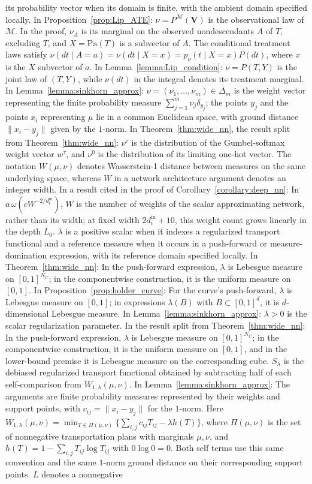 \documentclass[12pt]{article}
\theoremstyle{plain}
\theoremstyle{definition}
\theoremstyle{remark}
\begin{document}
its probability vector when its domain is finite, with the ambient domain specified locally. In Proposition~\ref{prop:Lip_ATE}: $\nu=P^{\mathcal M}(\boldsymbol V)$ is the observational law of $\mathcal M$. In the proof, $\nu_A$ is its marginal on the observed nondescendants $A$ of $T$, excluding $T$, and $X=\text{Pa}(T)$ is a subvector of $A$. The conditional treatment laws satisfy $\nu(dt\mid A=a)=\nu(dt\mid X=x)=p_\nu(t\mid X=x)P(dt)$, where $x$ is the $X$ subvector of $a$. In Lemma~\ref{lemma:Lip_condition}: $\nu=P(T,Y)$ is the joint law of $(T,Y)$, while $\nu(dt)$ in the integral denotes its treatment marginal. In Lemma~\ref{lemma:sinkhorn_approx}: $\nu=(\nu_1,\ldots,\nu_m)\in\Delta_m$ is the weight vector representing the finite probability measure $\sum_{j=1}^{m}\nu_j\delta_{y_j}$; the points $y_j$ and the points $x_i$ representing $\mu$ lie in a common Euclidean space, with ground distance $\|x_i-y_j\|$ given by the $1$-norm. In Theorem~\ref{thm:wide_nn}, the result split from Theorem~\ref{thm:wide_nn}: $\nu^\tau$ is the distribution of the Gumbel-softmax weight vector $w^\tau$, and $\nu^0$ is the distribution of its limiting one-hot vector. The notation $W(\mu,\nu)$ denotes Wasserstein-1 distance between measures on the same underlying space, whereas $W$ in a network architecture argument denotes an integer width. In a result cited in the proof of Corollary~\ref{corollary:deep_nn}: In $a\,\omega(cW^{-2/d_i^{\text{in}}})$, $W$ is the number of weights of the scalar approximating network, rather than its width; at fixed width $2d_i^{\text{in}}+10$, this weight count grows linearly in the depth $L_0$. $\lambda$ is a positive scalar when it indexes a regularized transport functional and a reference measure when it occurs in a push-forward or measure-domination expression, with its reference domain specified locally. In Theorem~\ref{thm:wide_nn}: In the push-forward expression, $\lambda$ is Lebesgue measure on $[0,1]^{N_C}$; in the componentwise construction, it is the uniform measure on $[0,1]$. In Proposition~\ref{prop:holder_curve}: For the curve's push-forward, $\lambda$ is Lebesgue measure on $[0,1]$; in expressions $\lambda(B)$ with $B\subset[0,1]^d$, it is $d$-dimensional Lebesgue measure. In Lemma~\ref{lemma:sinkhorn_approx}: $\lambda>0$ is the scalar regularization parameter. In the result split from Theorem~\ref{thm:wide_nn}: In the push-forward expression, $\lambda$ is Lebesgue measure on $[0,1]^{N_C}$; in the componentwise construction, it is the uniform measure on $[0,1]$, and in the lower-bound premise it is Lebesgue measure on the corresponding cube. $S_\lambda$ is the debiased regularized transport functional obtained by subtracting half of each self-comparison from $W_{1,\lambda}(\mu,\nu)$. In Lemma~\ref{lemma:sinkhorn_approx}: The arguments are finite probability measures represented by their weights and support points, with $c_{ij}=\|x_i-y_j\|$ for the $1$-norm. Here $W_{1,\lambda}(\mu,\nu)=\min_{T\in\Pi(\mu,\nu)}\{\sum_{i,j}c_{ij}T_{ij}-\lambda h(T)\}$, where $\Pi(\mu,\nu)$ is the set of nonnegative transportation plans with marginals $\mu,\nu$, and $h(T)=1-\sum_{i,j}T_{ij}\log T_{ij}$ with $0\log0=0$. Both self terms use this same convention and the same $1$-norm ground distance on their corresponding support points. $L$ denotes a nonnegative 
\end{document}
